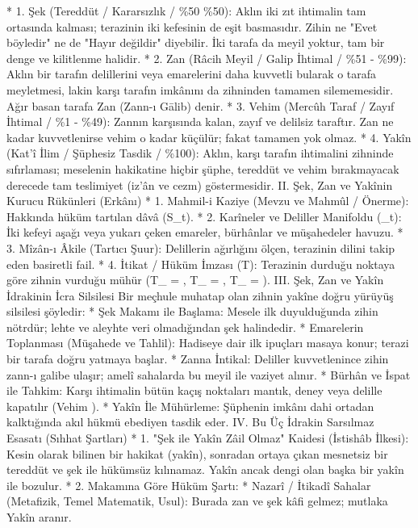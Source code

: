 \documentclass[11pt,a4paper]{article}
\begin{document}
 * 1. Şek (Tereddüt / Kararsızlık / \%50 \leftrightarrow \%50):
   Aklın iki zıt ihtimalin tam ortasında kalması; terazinin iki kefesinin de eşit basmasıdır. Zihin ne "Evet böyledir" ne de "Hayır değildir" diyebilir. İki tarafa da meyil yoktur, tam bir denge ve kilitlenme halidir.
 * 2. Zan (Râcih Meyil / Galip İhtimal / \%51 - \%99):
   Aklın bir tarafın delillerini veya emarelerini daha kuvvetli bularak o tarafa meyletmesi, lakin karşı tarafın imkânını da zihninden tamamen silememesidir. Ağır basan tarafa Zan (Zann-ı Gālib) denir.
 * 3. Vehim (Mercûh Taraf / Zayıf İhtimal / \%1 - \%49):
   Zannın karşısında kalan, zayıf ve delilsiz taraftır. Zan ne kadar kuvvetlenirse vehim o kadar küçülür; fakat tamamen yok olmaz.
 * 4. Yakîn (Kat'î İlim / Şüphesiz Tasdik / \%100):
   Aklın, karşı tarafın ihtimalini zihninde sıfırlaması; meselenin hakikatine hiçbir şüphe, tereddüt ve vehim bırakmayacak derecede tam teslimiyet (iz'ân ve cezm) göstermesidir.
II. Şek, Zan ve Yakînin Kurucu Rükünleri (Erkânı)
 * 1. Mahmil-i Kaziye (Mevzu ve Mahmûl / Önerme): Hakkında hüküm tartılan dâvâ (S_t).
 * 2. Karîneler ve Deliller Manifoldu (_t): İki kefeyi aşağı veya yukarı çeken emareler, bürhânlar ve müşahedeler havuzu.
 * 3. Mîzân-ı Âkile (Tartıcı Şuur): Delillerin ağırlığını ölçen, terazinin dilini takip eden basiretli fail.
 * 4. İtikat / Hüküm İmzası (T): Terazinin durduğu noktaya göre zihnin vurduğu mühür (T_{} = , T_{} = , T_{} = ).
III. Şek, Zan ve Yakîn İdrakinin İcra Silsilesi
Bir meçhule muhatap olan zihnin yakîne doğru yürüyüş silsilesi şöyledir:
 * Şek Makamı ile Başlama: Mesele ilk duyulduğunda zihin nötrdür; lehte ve aleyhte veri olmadığından şek halindedir.
 * Emarelerin Toplanması (Müşahede ve Tahlil): Hadiseye dair ilk ipuçları masaya konur; terazi bir tarafa doğru yatmaya başlar.
 * Zanna İntikal: Deliller kuvvetlenince zihin zann-ı galibe ulaşır; amelî sahalarda bu meyil ile vaziyet alınır.
 * Bürhân ve İspat ile Tahkim: Karşı ihtimalin bütün kaçış noktaları mantık, deney veya delille kapatılır (Vehim ).
 * Yakîn İle Mühürleme: Şüphenin imkânı dahi ortadan kalktığında akıl hükmü ebediyen tasdik eder.
IV. Bu Üç İdrakin Sarsılmaz Esasatı (Sıhhat Şartları)
 * 1. "Şek ile Yakîn Zâil Olmaz" Kaidesi (İstishâb İlkesi):
   Kesin olarak bilinen bir hakikat (yakîn), sonradan ortaya çıkan mesnetsiz bir tereddüt ve şek ile hükümsüz kılınamaz. Yakîn ancak dengi olan başka bir yakîn ile bozulur.
 * 2. Makamına Göre Hüküm Şartı:
   * Nazarî / İtikadî Sahalar (Metafizik, Temel Matematik, Usul): Burada zan ve şek kâfi gelmez; mutlaka Yakîn aranır.
\end{document}
